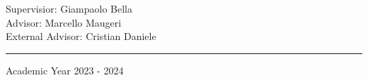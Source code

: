 \begin{titlepage}
\bigskip


\bigskip


\bigskip


\bigskip


\bigskip

{\raggedleft
Supervisior: Giampaolo Bella \\
Advisor: Marcello Maugeri \\
External Advisor: Cristian Daniele
\par}


\bigskip


\bigskip


\bigskip


\bigskip

\hrule

\bigskip

{\centering
Academic Year 2023 - 2024
\par}
\end{titlepage}
